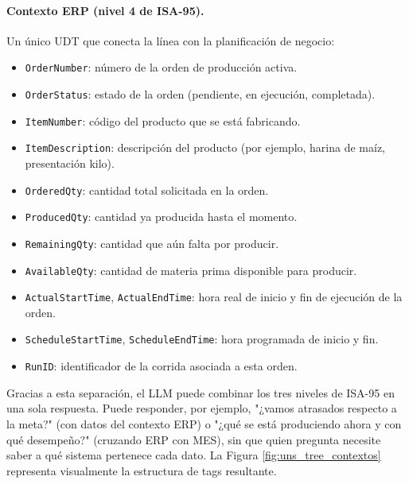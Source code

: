 \paragraph{Contexto ERP (nivel 4 de ISA-95).} Un único UDT que conecta la línea con la planificación de negocio:
\begin{itemize}
    \item \texttt{OrderNumber}: número de la orden de producción activa.
    \item \texttt{OrderStatus}: estado de la orden (pendiente, en ejecución, completada).
    \item \texttt{ItemNumber}: código del producto que se está fabricando.
    \item \texttt{ItemDescription}: descripción del producto (por ejemplo, harina de maíz, presentación kilo).
    \item \texttt{OrderedQty}: cantidad total solicitada en la orden.
    \item \texttt{ProducedQty}: cantidad ya producida hasta el momento.
    \item \texttt{RemainingQty}: cantidad que aún falta por producir.
    \item \texttt{AvailableQty}: cantidad de materia prima disponible para producir.
    \item \texttt{ActualStartTime}, \texttt{ActualEndTime}: hora real de inicio y fin de ejecución de la orden.
    \item \texttt{ScheduleStartTime}, \texttt{ScheduleEndTime}: hora programada de inicio y fin.
    \item \texttt{RunID}: identificador de la corrida asociada a esta orden.
\end{itemize}

Gracias a esta separación, el LLM puede combinar los tres niveles de ISA-95 en una sola respuesta. Puede responder, por ejemplo, "¿vamos atrasados respecto a la meta?" (con datos del contexto ERP) o "¿qué se está produciendo ahora y con qué desempeño?" (cruzando ERP con MES), sin que quien pregunta necesite saber a qué sistema pertenece cada dato. La Figura \ref{fig:uns_tree_contextos} representa visualmente la estructura de tags resultante.

